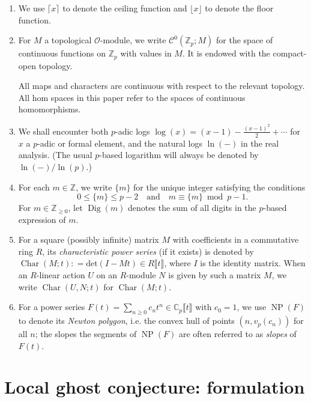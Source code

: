 \documentclass[12pt]{amsart}
\theoremstyle{definition}
\numberwithin{equation}{subsection}
\def\calC{\mathcal{C}}
\def\calO{\mathcal{O}}
\def\CC{\mathbb{C}}
\def\ZZ{\mathbb{Z}}
\DeclareMathOperator{\NP}{NP}
\DeclareMathOperator{\Dig}{Dig}
\renewcommand{\det}{\mathrm{det}}
\DeclareMathOperator{\Char}{Char}
\begin{document}
\begin{enumerate}
\item We use $\lceil x\rceil$ to denote the ceiling function and $\lfloor x\rfloor$ to denote the floor function.

\item For $M$ a topological $\calO$-module, we write $\calC^0(\ZZ_p; M)$ for the space of continuous functions on $\ZZ_p$ with values in $M$. It is endowed with the compact-open topology.

All maps and characters are continuous with respect to the relevant topology. All hom spaces in this paper refer to the spaces of continuous homomorphisms.



\item We shall encounter both $p$-adic logs $\log(x) = (x-1) - \frac{(x-1)^2}2 + \cdots $ for $x$ a $p$-adic or formal element,  and the natural logs $\ln(-)$ in the real analysis. (The usual $p$-based logarithm will always be denoted by $\ln(-)/\ln(p)$.)


\item For each $m \in \ZZ$, we write $\{m\}$ for the unique integer
satisfying the conditions 
$$0\leq \{m\}\leq p-2 \quad \textrm{and} \quad m\equiv \{m\}
\bmod{p-1}.$$
For $m \in \ZZ_{\geq 0}$, let $\Dig(m)$ denotes the sum of all digits in the $p$-based expression of $m$.

\item For a square (possibly infinite) matrix $M$ with coefficients in a commutative ring $R$, its \emph{characteristic power series} (if it exists) is denoted by $\Char(M;t) : = \det(I- Mt) \in R\llbracket t\rrbracket$, where $I$ is the identity matrix.  When an $R$-linear action $U$ on an $R$-module $N$ is given by such a matrix $M$, we write $\Char (U, N; t)$ for $\Char (M;t)$.



\item For a power series $F(t) = \sum_{n \geq 0} c_nt^n \in \CC_p\llbracket t\rrbracket$ with $c_0=1$, we use $\NP(F)$ to denote its \emph{Newton polygon}, i.e. the convex hull of points $(n, v_p(c_n))$ for all $n$; the slopes the segments of $\NP(F)$ are often referred to as \emph{slopes} of $F(t)$.

\end{enumerate}

\section{Local ghost conjecture: formulation}
\label{Sec:local conjecture}
\end{document}
